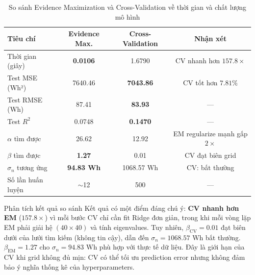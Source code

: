 \begin{table}[H]
\centering
\caption{So sánh Evidence Maximization và Cross-Validation về thời gian và chất lượng mô hình}
\label{tab:em_vs_cv}
\begin{tabular}{lccc}
\toprule
\textbf{Tiêu chí} & \textbf{Evidence Max.} & \textbf{Cross-Validation} & \textbf{Nhận xét} \\
\midrule
Thời gian (giây)   & \textbf{0.0106} & 1.6790 & CV nhanh hơn $157.8\times$ \\
Test MSE (Wh²)     & 7640.46 & \textbf{7043.86} & CV tốt hơn $7.81\%$ \\
Test RMSE (Wh)     & 87.41   & \textbf{83.93}   & --- \\
Test $R^2$         & 0.0748  & \textbf{0.1470}  & --- \\
\midrule
$\alpha$ tìm được  & 26.62 & 12.92 & EM regularize mạnh gấp $2\times$ \\
$\beta$ tìm được   & \textbf{1.27} & 0.01 & CV đạt biên grid \\
$\sigma_n$ tương ứng & \textbf{94.83 Wh} & 1068.57 Wh & CV: bất thường \\
Số lần huấn luyện  & $\sim$12 & 500 & --- \\
\bottomrule
\end{tabular}
\end{table}

\begin{importantbox}{Phân tích kết quả so sánh}
Kết quả có một điểm đáng chú ý: \textbf{CV nhanh hơn EM} ($157.8\times$) vì mỗi bước CV chỉ cần fit Ridge đơn giản, trong khi mỗi vòng lặp EM phải giải hệ $(40 \times 40)$ và tính eigenvalues. Tuy nhiên, $\beta_\text{CV} = 0.01$ đạt biên dưới của lưới tìm kiếm (không tin cậy), dẫn đến $\sigma_n = 1068.57$ Wh bất thường. $\beta_\text{EM} = 1.27$ cho $\sigma_n = 94.83$ Wh phù hợp với thực tế dữ liệu. Đây là giới hạn của CV khi grid không đủ mịn: CV có thể tối ưu prediction error nhưng không đảm bảo ý nghĩa thống kê của hyperparameters.
\end{importantbox}

